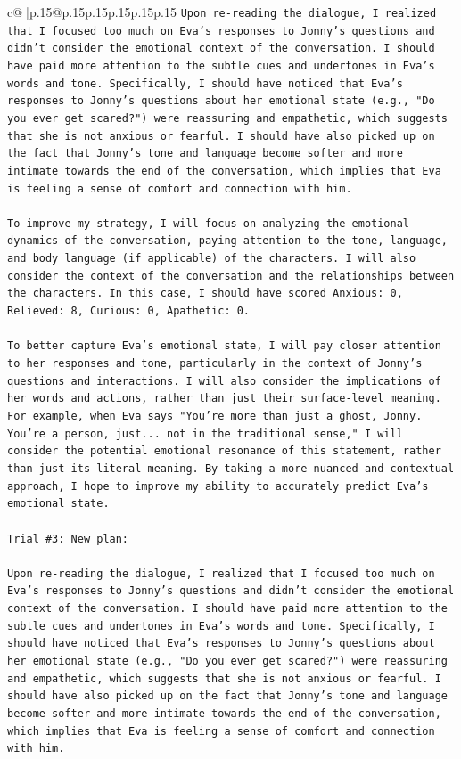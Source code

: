 \documentclass{article}
\begin{document}
{\begin{supertabular}{c@{$\;$}|p{.15\linewidth}@{}p{.15\linewidth}p{.15\linewidth}p{.15\linewidth}p{.15\linewidth}p{.15\linewidth}}
{{{\texttt{Upon re{-}reading the dialogue, I realized that I focused too much on Eva's responses to Jonny's questions and didn't consider the emotional context of the conversation. I should have paid more attention to the subtle cues and undertones in Eva's words and tone. Specifically, I should have noticed that Eva's responses to Jonny's questions about her emotional state (e.g., "Do you ever get scared?") were reassuring and empathetic, which suggests that she is not anxious or fearful. I should have also picked up on the fact that Jonny's tone and language become softer and more intimate towards the end of the conversation, which implies that Eva is feeling a sense of comfort and connection with him. } \\
\\ 
\texttt{To improve my strategy, I will focus on analyzing the emotional dynamics of the conversation, paying attention to the tone, language, and body language (if applicable) of the characters. I will also consider the context of the conversation and the relationships between the characters. In this case, I should have scored Anxious: 0, Relieved: 8, Curious: 0, Apathetic: 0.} \\
\\ 
\texttt{To better capture Eva's emotional state, I will pay closer attention to her responses and tone, particularly in the context of Jonny's questions and interactions. I will also consider the implications of her words and actions, rather than just their surface{-}level meaning. For example, when Eva says "You're more than just a ghost, Jonny. You're a person, just... not in the traditional sense," I will consider the potential emotional resonance of this statement, rather than just its literal meaning. By taking a more nuanced and contextual approach, I hope to improve my ability to accurately predict Eva's emotional state.} \\
\\ 
\texttt{Trial \#3: New plan: } \\
\\ 
\texttt{Upon re{-}reading the dialogue, I realized that I focused too much on Eva's responses to Jonny's questions and didn't consider the emotional context of the conversation. I should have paid more attention to the subtle cues and undertones in Eva's words and tone. Specifically, I should have noticed that Eva's responses to Jonny's questions about her emotional state (e.g., "Do you ever get scared?") were reassuring and empathetic, which suggests that she is not anxious or fearful. I should have also picked up on the fact that Jonny's tone and language become softer and more intimate towards the end of the conversation, which implies that Eva is feeling a sense of comfort and connection with him. } \\
}}}
\end{supertabular}}
\end{document}
